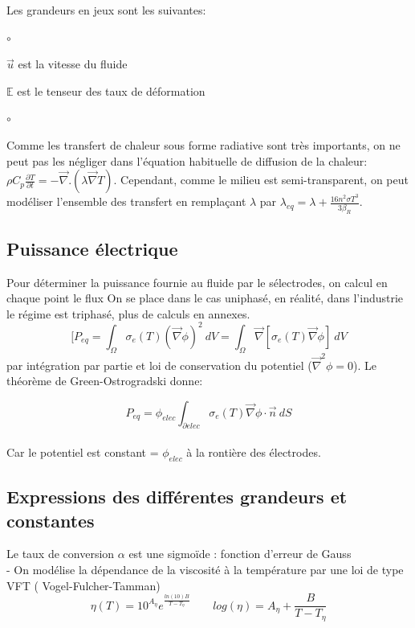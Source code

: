 \documentclass[12pt, a4paper, french, BCOR = 0pt, DIV = 10]{scrartcl}
\begin{document}
    Les grandeurs en jeux sont les suivantes:
    \begin{list}{$\circ$}{}
        \item $\vec{u}$ est la vitesse du fluide
        \item $\mathbb{E}$ est le tenseur des taux de déformation
    \end{list}{$\circ$}{}

    Comme les transfert de chaleur sous forme radiative sont très importants, on ne peut pas les négliger dans l'équation habituelle de diffusion de la chaleur: $ \rho C_{p} \frac{\partial T}{\partial t} = - \vec{\nabla} . (\lambda\vec{\nabla}T) $. Cependant, comme le milieu est semi-transparent, on peut modéliser l'ensemble des transfert en remplaçant $\lambda$ par $\lambda_{eq} = \lambda + \frac{16n^{2} \sigma T^{3}}{3\beta_{R}} $.
    \\
    
    
    \subsection{Puissance électrique}
    Pour déterminer la puissance fournie au fluide par le sélectrodes, on calcul en chaque point le flux 
    On se place dans le cas uniphasé, en réalité, dans l'industrie le régime est triphasé, plus de calculs en annexes. \\ [0.2 cm ]
    $$
    [ P_{eq}=\int_\Omega \sigma_{e}(T)(\vec \nabla\phi)^2~dV  = \int_\Omega \vec \nabla[\sigma_{e}(T)\vec \nabla\phi]~dV
    $$
    par intégration par partie et loi de conservation du potentiel ($ \vec{\nabla}^2 \phi = 0 $). Le théorème de Green-Ostrogradski donne: 
    
    \[ P_{eq}=\phi_{elec} \int_{\partial elec} \sigma_{e}(T)\vec \nabla\phi \cdot \vec{n}~dS\]
    \\
    Car le potentiel est constant = $\phi_{elec} $ à la rontière des électrodes. \\
    \subsection{ Expressions des différentes grandeurs et constantes}
    Le taux de conversion $\alpha$ est une sigmoïde : fonction d'erreur de Gauss\\ [0.3cm]
    
    - On modélise la dépendance de la viscosité à la température par une loi de type VFT ( Vogel-Fulcher-Tamman) \\ [0.5 cm]
    $$
    \eta (T)  = 10^{A_{\eta}} e^{\frac{ln(10) B}{T-T_{\eta}}} ~~~~~~~~~ log(\eta) = A_{\eta} + \frac{B}{T-T_{\eta}}
    $$
\end{document}
